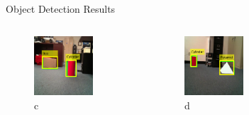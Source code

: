 \documentclass[10pt]{beamer}
\begin{document}
\begin{frame}{Object Detection Results}
\begin{columns}
\begin{figure}
         \centering
         \includegraphics[width=0.75\textwidth]{Images/tt3.png}
         \caption{c}
     \end{figure}
     \vspace{-10pt}
     \begin{figure}
         \centering
         \includegraphics[width=0.75\textwidth]{Images/tt4.png}
         \caption{d}
     \end{figure}
     \begin{figure}
         \centering

\end{figure}
\end{columns}
\end{frame}
\end{document}
